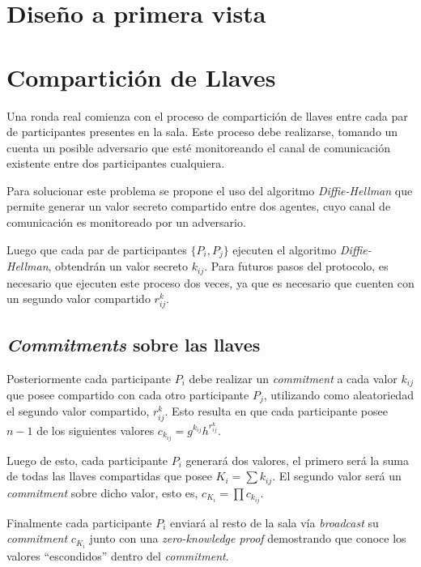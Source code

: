 \section{Diseño a primera vista}


\section{Compartición de Llaves}

Una ronda real comienza con el proceso de compartición de llaves entre cada 
par de participantes presentes en la sala. Este proceso debe realizarse, 
tomando un cuenta un posible adversario que esté monitoreando el canal de 
comunicación existente entre dos participantes cualquiera.

Para solucionar este problema se propone el uso del algoritmo 
\emph{Diffie-Hellman} \cite{diffie1976new} que permite generar un valor 
secreto compartido entre dos agentes, cuyo canal de comunicación es 
monitoreado por un adversario.

Luego que cada par de participantes $\{P_i, P_j\}$ ejecuten el algoritmo 
\emph{Diffie-Hellman}, obtendrán un valor secreto $k_{ij}$. Para futuros pasos 
del protocolo, es necesario que ejecuten este proceso dos veces, ya que es 
necesario que cuenten con un segundo valor compartido $r^k_{ij}$.

\subsection{\emph{Commitments} sobre las llaves}

Posteriormente cada participante $P_i$ debe realizar un \emph{commitment} a 
cada valor $k_{ij}$ que posee compartido con cada otro participante $P_j$, 
utilizando como aleatoriedad el segundo valor compartido, $r^k_{ij}$. Esto 
resulta en que cada participante posee $n - 1$ de los siguientes valores 
$c_{k_{ij}} = g^{k_{ij}} h^{r^k_{ij}}$.

Luego de esto, cada participante $P_i$ generará dos valores, el primero será 
la suma de todas las llaves compartidas que posee $K_i = \sum k_{ij}$. El 
segundo valor será un \emph{commitment} sobre dicho valor, esto es, 
$c_{K_i} = \prod c_{k_{ij}}$.

Finalmente cada participante $P_i$ enviará al resto de la sala vía 
\emph{broadcast} su \emph{commitment} $c_{K_i}$ junto con una 
\emph{zero-knowledge proof} demostrando que conoce los valores ``escondidos'' 
dentro del \emph{commitment}.

